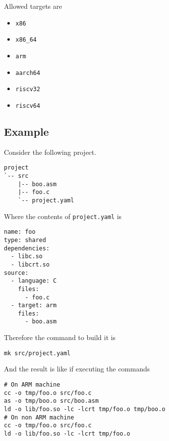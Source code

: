 \documentclass[
   article,                      %
   10pt,                         %
   openright,                    %
   oneside,                      %
   a4paper,                      %
   sumario = tradicional,        %
   english,                      %
   xcolor=table                  %
]{abntex2}
\begin{document}
Allowed targets are
\begin{itemize}
   \item \texttt{x86}
   \item \texttt{x86\_64}
   \item \texttt{arm}
   \item \texttt{aarch64}
   \item \texttt{riscv32}
   \item \texttt{riscv64}
\end{itemize}

\subsection{Example}

Consider the following project.

\begin{lstlisting}
project
`-- src
    |-- boo.asm
    |-- foo.c
    `-- project.yaml
\end{lstlisting}

Where the contents of \texttt{project.yaml} is

\begin{lstlisting}[style=yaml]
name: foo
type: shared
dependencies:
  - libc.so
  - libcrt.so
source:
  - language: C
    files:
      - foo.c
  - target: arm
    files:
      - boo.asm
\end{lstlisting}

\noindent
Therefore the command to build it is

\begin{lstlisting}[style=bash]
mk src/project.yaml
\end{lstlisting}

\noindent
And the result is like if executing the commands

\begin{lstlisting}[style=bash]
# On ARM machine
cc -o tmp/foo.o src/foo.c
as -o tmp/boo.o src/boo.asm
ld -o lib/foo.so -lc -lcrt tmp/foo.o tmp/boo.o
# On non ARM machine
cc -o tmp/foo.o src/foo.c
ld -o lib/foo.so -lc -lcrt tmp/foo.o
\end{lstlisting}
\end{document}
